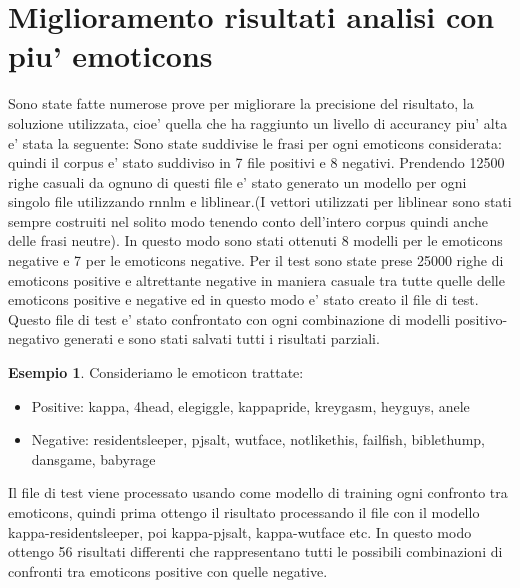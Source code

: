 \documentclass[a4paper,11pt]{book}
\theoremstyle{definition}
\newtheorem{es}{Esempio}[section]
\begin{document}
\section{Miglioramento risultati analisi con piu' emoticons}
Sono state fatte numerose prove per migliorare la precisione del risultato, la soluzione utilizzata, cioe' quella che ha raggiunto un livello di accurancy piu' alta e' stata la seguente:
Sono state suddivise le frasi per ogni emoticons considerata: quindi il corpus e' stato suddiviso in 7 file positivi e 8 negativi. Prendendo 12500 righe casuali da ognuno di questi file e' stato generato un modello per ogni singolo file utilizzando rnnlm e liblinear.(I vettori utilizzati per liblinear sono stati sempre costruiti nel solito modo tenendo conto dell'intero corpus quindi anche delle frasi neutre). In questo modo sono stati ottenuti 8 modelli per le emoticons negative e 7 per le emoticons negative.
Per il test sono state prese 25000 righe di emoticons positive e altrettante negative in maniera casuale tra tutte quelle delle emoticons positive e negative ed in questo modo e' stato creato il file di test. Questo file di test e' stato confrontato con ogni combinazione di modelli positivo-negativo generati e sono stati salvati tutti i risultati parziali.
\begin{es}
Consideriamo le emoticon trattate:
\begin{itemize}
\item Positive: kappa, 4head, elegiggle, kappapride, kreygasm, heyguys, anele
\item Negative: residentsleeper, pjsalt, wutface, notlikethis, failfish, biblethump, dansgame, babyrage
\end{itemize}
Il file di test viene processato usando come modello di training ogni confronto tra emoticons, quindi prima ottengo il risultato processando il file con il modello kappa-residentsleeper, poi kappa-pjsalt, kappa-wutface etc. In questo modo ottengo 56 risultati differenti che rappresentano tutti le possibili combinazioni di confronti tra emoticons positive con quelle negative.
\end{es}
\end{document}
